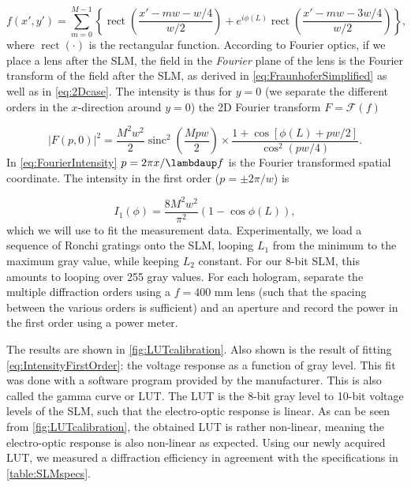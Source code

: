 \begin{equation}\label{eq:FieldAfterSLM}
    f(x',y') = \sum_{m=0}^{M-1} \left\{
    \operatorname{rect}\left(\frac{x'-m w - w/4}{w/2}\right) + e^{i \phi(L)} \operatorname{rect}\left(\frac{x'- m w - 3 w/4}{w/2}\right)
    \right\},
\end{equation}
where $\operatorname{rect}(\cdot)$ is the rectangular function. 
According to Fourier optics, if we place a lens after the SLM, the field in the \textit{Fourier} plane of the lens is the Fourier transform of the field after the SLM, as derived in \cref{eq:FraunhoferSimplified} as well as in \cref{eq:2Dcase}.
The intensity is thus for $y=0$ (we separate the different orders in the $x$-direction around $y=0$) the 2D Fourier transform $F = \mathcal{F}(f)$ \cite{Zhang1994}

\begin{equation}\label{eq:FourierIntensity}
    |F(p,0)|^2=
    \frac{M^2 w^2}{2}\operatorname{sinc}^2\left(\frac{M p w}{2}\right) \times
    \frac{1 + \cos{\left[\phi(L)+p w/2\right]}}{\cos^2(p w/4)}.
\end{equation}
In \cref{eq:FourierIntensity} $p=2\pi x/\lambdaup f$ is the Fourier transformed spatial coordinate. The intensity in the first order ($p=\pm 2\pi/w$) is

\begin{equation}\label{eq:IntensityFirstOrder}
    I_1(\phi) =
    \frac{8M^2w^2}{\pi^2} \left( 
    1-\cos{\phi(L)}
    \right),
\end{equation}
which we will use to fit the measurement data. Experimentally, we load a sequence of Ronchi gratings onto the SLM, looping $L_1$ from the minimum to the maximum gray value, while keeping $L_2$ constant. 
For our 8-bit SLM, this amounts to looping over 255 gray values.
For each hologram, separate the multiple diffraction orders using a $f=400$ mm lens (such that the spacing between the various orders is sufficient) and an aperture and record the power in the first order using a power meter.

The results are shown in \cref{fig:LUTcalibration}. 
Also shown is the result of fitting \cref{eq:IntensityFirstOrder}: the voltage response as a function of gray level. 
This fit was done with a software program provided by the manufacturer.
This is also called the gamma curve or \ac{LUT}.
The LUT is the 8-bit gray level to 10-bit voltage levels of the SLM, such that the electro-optic response is linear. 
As can be seen from \cref{fig:LUTcalibration}, the obtained LUT is rather non-linear, meaning the electro-optic response is also non-linear as expected.
Using our newly acquired LUT, we measured a diffraction efficiency in agreement with the specifications in \cref{table:SLMspecs}.

